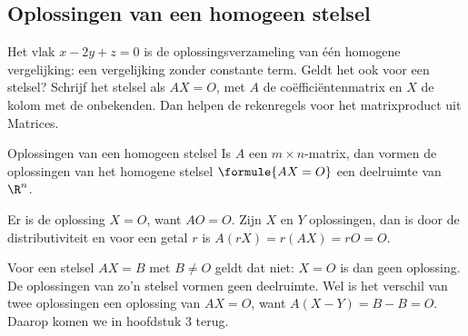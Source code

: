 \subsection{Oplossingen van een homogeen stelsel}

Het vlak $x - 2y + z = 0$ is de oplossingsverzameling van één homogene vergelijking: een vergelijking zonder constante term. Geldt het ook voor een stelsel? Schrijf het stelsel als $AX = O$, met $A$ de coëfficiëntenmatrix en $X$ de kolom met de onbekenden. Dan helpen de rekenregels voor het matrixproduct uit Matrices.

\begin{theorie}
\begin{stelling}{Oplossingen van een homogeen stelsel}
Is $A$ een $m \times n$-matrix, dan vormen de oplossingen van het homogene stelsel $\formule{AX = O}$ een deelruimte van $\R^n$.
\end{stelling}

\begin{bewijs}
Er is de oplossing $X = O$, want $AO = O$. Zijn $X$ en $Y$ oplossingen, dan is door de distributiviteit
en voor een getal $r$ is $A(rX) = r(AX) = rO = O$.
\end{bewijs}
\end{theorie}

Voor een stelsel $AX = B$ met $B \neq O$ geldt dat niet: $X = O$ is dan geen oplossing. De oplossingen van zo'n stelsel vormen geen deelruimte. Wel is het verschil van twee oplossingen een oplossing van $AX = O$, want $A(X - Y) = B - B = O$. Daarop komen we in hoofdstuk 3 terug.


